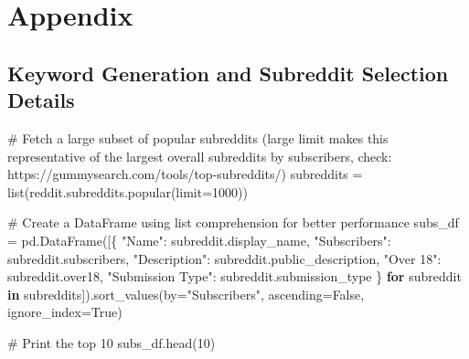 \documentclass[
  12pt,
  letterpaper,
  DIV=11,
  numbers=noendperiod]{scrartcl}
\newenvironment{Shaded}{\begin{snugshade}}{\end{snugshade}}
\newcommand{\BuiltInTok}[1]{\textcolor[rgb]{0.00,0.23,0.31}{#1}}
\newcommand{\CommentTok}[1]{\textcolor[rgb]{0.37,0.37,0.37}{#1}}
\newcommand{\ControlFlowTok}[1]{\textcolor[rgb]{0.00,0.23,0.31}{\textbf{#1}}}
\newcommand{\DecValTok}[1]{\textcolor[rgb]{0.68,0.00,0.00}{#1}}
\newcommand{\KeywordTok}[1]{\textcolor[rgb]{0.00,0.23,0.31}{\textbf{#1}}}
\newcommand{\NormalTok}[1]{\textcolor[rgb]{0.00,0.23,0.31}{#1}}
\newcommand{\OperatorTok}[1]{\textcolor[rgb]{0.37,0.37,0.37}{#1}}
\newcommand{\StringTok}[1]{\textcolor[rgb]{0.13,0.47,0.30}{#1}}
\newcommand{\VariableTok}[1]{\textcolor[rgb]{0.07,0.07,0.07}{#1}}
\begin{document}
\section*{Appendix}\label{appendix}

\subsection*{Keyword Generation and Subreddit Selection
Details}\label{keyword-generation-and-subreddit-selection-details}

\begin{Shaded}
\begin{Highlighting}[]
\CommentTok{\# Fetch a large subset of popular subreddits (large limit makes this representative of the largest overall subreddits by subscribers, check: https://gummysearch.com/tools/top{-}subreddits/)}
\NormalTok{subreddits }\OperatorTok{=} \BuiltInTok{list}\NormalTok{(reddit.subreddits.popular(limit}\OperatorTok{=}\DecValTok{1000}\NormalTok{))}

\CommentTok{\# Create a DataFrame using list comprehension for better performance}
\NormalTok{subs\_df }\OperatorTok{=}\NormalTok{ pd.DataFrame([\{}
    \StringTok{"Name"}\NormalTok{: subreddit.display\_name,}
    \StringTok{"Subscribers"}\NormalTok{: subreddit.subscribers,}
    \StringTok{"Description"}\NormalTok{: subreddit.public\_description,}
    \StringTok{"Over 18"}\NormalTok{: subreddit.over18,}
    \StringTok{"Submission Type"}\NormalTok{: subreddit.submission\_type}
\NormalTok{\} }\ControlFlowTok{for}\NormalTok{ subreddit }\KeywordTok{in}\NormalTok{ subreddits]).sort\_values(by}\OperatorTok{=}\StringTok{"Subscribers"}\NormalTok{, ascending}\OperatorTok{=}\VariableTok{False}\NormalTok{, ignore\_index}\OperatorTok{=}\VariableTok{True}\NormalTok{)}

\CommentTok{\# Print the top 10}
\NormalTok{subs\_df.head(}\DecValTok{10}\NormalTok{)}
\end{Highlighting}
\end{Shaded}
\end{document}
